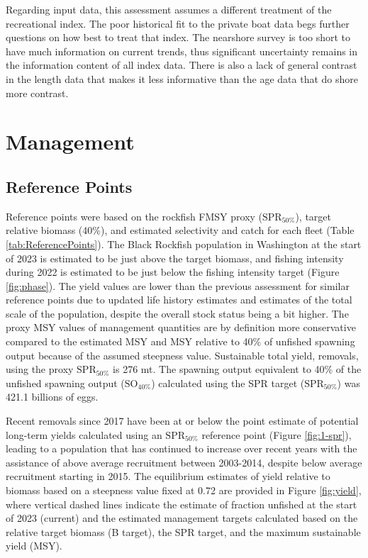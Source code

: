 \documentclass[11pt,
  letterpaper,
]{article}
\begin{document}
Regarding input data, this assessment assumes a different treatment of the recreational index. The poor historical fit to the private boat data begs further questions on how best to treat that index. The nearshore survey is too short to have much information on current trends, thus significant uncertainty remains in the information content of all index data. There is also a lack of general contrast in the length data that makes it less informative than the age data that do shore more contrast.

\hypertarget{management}{%
\section{Management}\label{management}}

\hypertarget{reference-points-1}{%
\subsection{Reference Points}\label{reference-points-1}}

Reference points were based on the rockfish FMSY proxy (\(\text{SPR}_{50\%}\)), target relative biomass (40\%), and estimated selectivity and catch for each fleet (Table \ref{tab:ReferencePoints}). The Black Rockfish population in Washington at the start of 2023 is estimated to be just above the target biomass, and fishing intensity during 2022 is estimated to be just below the fishing intensity target (Figure \ref{fig:phase}). The yield values are lower than the previous assessment for similar reference points due to updated life history estimates and estimates of the total scale of the population, despite the overall stock status being a bit higher. The proxy MSY values of management quantities are by definition more conservative compared to the estimated MSY and MSY relative to 40\% of unfished spawning output because of the assumed steepness value. Sustainable total yield, removals, using the proxy \(\text{SPR}_{50\%}\) is 276 mt. The spawning output equivalent to 40\% of the unfished spawning output (\(\text{SO}_{40\%}\)) calculated using the SPR target (\(\text{SPR}_{50\%}\)) was 421.1 billions of eggs.

Recent removals since 2017 have been at or below the point estimate of potential long-term yields calculated using an \(\text{SPR}_{50\%}\) reference point (Figure \ref{fig:1-spr}), leading to a population that has continued to increase over recent years with the assistance of above average recruitment between 2003-2014, despite below average recruitment starting in 2015. The equilibrium estimates of yield relative to biomass based on a steepness value fixed at 0.72 are provided in Figure \ref{fig:yield}, where vertical dashed lines indicate the estimate of fraction unfished at the start of 2023 (current) and the estimated management targets calculated based on the relative target biomass (B target), the SPR target, and the maximum sustainable yield (MSY).
\end{document}
